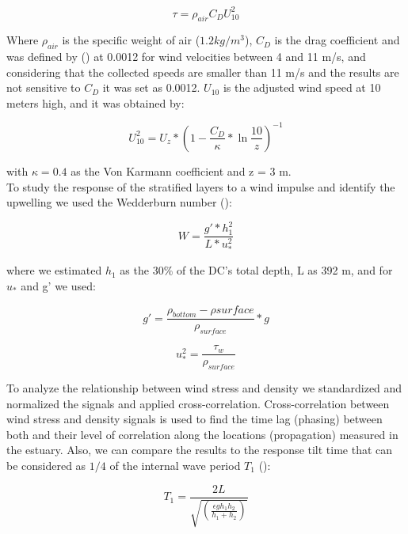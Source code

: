 \documentclass[11pt,letterpaper]{article}
\begin{document}
\begin{equation}
    \tau=\rho_{air} C_D U_{10}^2
    \label{eq: tau}
\end{equation}

Where $\rho_{air}$ is the specific weight of air ($1.2 kg/m^3$), $C_D$ is the drag coefficient and was defined by \citeauthor{large1981open} (\cite*{large1981open}) at 0.0012 for wind velocities between 4 and 11 m/s, and considering that the collected speeds are smaller than 11 m/s and the results are not sensitive to $C_D$ it was set as 0.0012. $U_{10}$ is the adjusted wind speed at 10 meters high, and it was obtained by: 

\begin{equation}
    U_{10}^2=U_z*(1-\frac{C_D}{\kappa}*\ln{\frac{10}{z}})^{-1}
    \label{eq: adjvel}
\end{equation}

with $\kappa=0.4$ as the Von Karmann coefficient and z = 3 m.\\

To study the response of the stratified layers to a wind impulse and identify the upwelling we used the Wedderburn number (\cite{Shintani2010}):

\begin{equation}
    W=\frac{g'*h_1^2}{L*u_*^2}
    \label{eq: wed}
\end{equation}

where we estimated $h_1$ as the 30\% of the DC’s total depth, L as 392 m, and for $u_*$ and g' we used:

\begin{equation}
    g'=\frac{\rho_{bottom}-\rho{surface}}{\rho_{surface}}*g
    \label{eq: redg}
\end{equation}

\begin{equation}
    u_*^2=\frac{\tau_w}{\rho_{surface}}
    \label{eq: ustar}
\end{equation}


To analyze the relationship between wind stress and density we standardized and normalized the signals and applied cross-correlation. Cross-correlation between wind stress and density signals is used to find the time lag (phasing) between both and their level of correlation along the locations (propagation) measured in the estuary. Also, we can compare the results to the response tilt time that can be considered as $1/4$ of the internal wave period $T_1$ (\cite{stevens1996initial}): 

\begin{equation}
    T_1=\frac{2L}{\sqrt{(\frac{\epsilon g h_1 h_2}{h_1 + h_2})}}
    \label{eq: period}
\end{equation}
\end{document}
